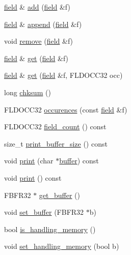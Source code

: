 \begin{DoxyCompactItemize}
\item 
\hyperlink{classatmi_1_1field}{field} \& \hyperlink{classatmi_1_1buffer_a5f30826d8273b619380e8b4f039af094}{add} (\hyperlink{classatmi_1_1field}{field} \&f)
\item 
\hyperlink{classatmi_1_1field}{field} \& \hyperlink{classatmi_1_1buffer_a4a9abeb69354fa575c8b27c9af170e79}{append} (\hyperlink{classatmi_1_1field}{field} \&f)
\item 
void \hyperlink{classatmi_1_1buffer_a4a1ef484befbf22aca919fc1a312ab61}{remove} (\hyperlink{classatmi_1_1field}{field} \&f)
\item 
\hyperlink{classatmi_1_1field}{field} \& \hyperlink{classatmi_1_1buffer_affb14c05bc21e29c3a2f6dc03c30c0fa}{get} (\hyperlink{classatmi_1_1field}{field} \&f)
\item 
\hyperlink{classatmi_1_1field}{field} \& \hyperlink{classatmi_1_1buffer_a864adb4d0153e6be38a7905c994915e1}{get} (\hyperlink{classatmi_1_1field}{field} \&f, F\+L\+D\+O\+C\+C32 occ)
\item 
long \hyperlink{classatmi_1_1buffer_a4ae9fa419098eb136ae3681ad90ccafb}{chksum} ()
\item 
F\+L\+D\+O\+C\+C32 \hyperlink{classatmi_1_1buffer_a57ff1b2ed449d59d4ec936e9e79a5d1a}{occurences} (const \hyperlink{classatmi_1_1field}{field} \&f)
\item 
F\+L\+D\+O\+C\+C32 \hyperlink{classatmi_1_1buffer_a74a6ff6ab31eb1128fc2f40d2a8e020f}{field\+\_\+count} () const 
\item 
size\+\_\+t \hyperlink{classatmi_1_1buffer_ae315c028b78f321abce6d9be2e026813}{print\+\_\+buffer\+\_\+size} () const 
\item 
void \hyperlink{classatmi_1_1buffer_ad7b1a3f9005926e07d00393aa6300f39}{print} (char $\ast$\hyperlink{classatmi_1_1buffer}{buffer}) const 
\item 
void \hyperlink{classatmi_1_1buffer_aa5f087559f5f3fb4f383121f78f2c461}{print} () const 
\item 
F\+B\+F\+R32 $\ast$ \hyperlink{classatmi_1_1buffer_aa9aa5382717ed17a2047db2779f8f0ec}{get\+\_\+buffer} ()
\item 
void \hyperlink{classatmi_1_1buffer_ade8853e7c2ae10dcd024b34049e99af3}{set\+\_\+buffer} (F\+B\+F\+R32 $\ast$b)
\item 
bool \hyperlink{classatmi_1_1buffer_aae543cf7816b338d20031993c18ce491}{is\+\_\+handling\+\_\+memory} ()
\item 
void \hyperlink{classatmi_1_1buffer_a68f05d1dbd040062850feeba5aa188fc}{set\+\_\+handling\+\_\+memory} (bool b)
\item 

\end{DoxyCompactItemize}
